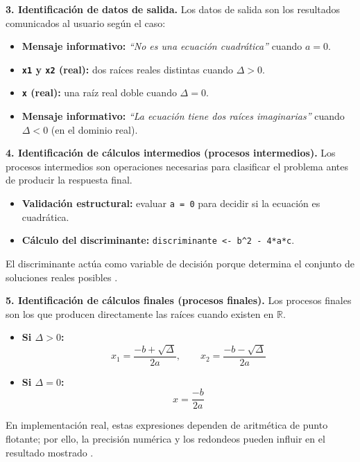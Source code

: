 \documentclass[12pt,twoside]{book}
\begin{document}
						\noindent
						\textbf{3. Identificación de datos de salida.}
						Los datos de salida son los resultados comunicados al usuario según el caso:
						
						\begin{itemize}
							\item \textbf{Mensaje informativo:} \textit{``No es una ecuación cuadrática''} cuando $a=0$.
							\item \textbf{\texttt{x1} y \texttt{x2} (real):} dos raíces reales distintas cuando $\Delta>0$.
							\item \textbf{\texttt{x} (real):} una raíz real doble cuando $\Delta=0$.
							\item \textbf{Mensaje informativo:} \textit{``La ecuación tiene dos raíces imaginarias''} cuando $\Delta<0$ (en el dominio real).
						\end{itemize}
						
						\noindent
						\textbf{4. Identificación de cálculos intermedios (procesos intermedios).}
						Los procesos intermedios son operaciones necesarias para clasificar el problema antes de producir la respuesta final.
						
						\begin{itemize}
							\item \textbf{Validación estructural:} evaluar \texttt{a = 0} para decidir si la ecuación es cuadrática.
							\item \textbf{Cálculo del discriminante:} \texttt{discriminante <- b\^{}2 - 4*a*c}.
						\end{itemize}
						
						\noindent
						El discriminante actúa como variable de decisión porque determina el conjunto de soluciones reales posibles \cite{Joyanes2007Fundamentos}.
						
						\noindent
						\textbf{5. Identificación de cálculos finales (procesos finales).}
						Los procesos finales son los que producen directamente las raíces cuando existen en $\mathbb{R}$.
						
						\begin{itemize}
							\item \textbf{Si $\Delta>0$:}
							\[
							x_1=\frac{-b+\sqrt{\Delta}}{2a},\qquad x_2=\frac{-b-\sqrt{\Delta}}{2a}
							\]
							\item \textbf{Si $\Delta=0$:}
							\[
							x=\frac{-b}{2a}
							\]
						\end{itemize}
						
						\noindent
						En implementación real, estas expresiones dependen de aritmética de punto flotante; por ello, la precisión numérica y los redondeos pueden influir en el resultado mostrado \cite{Goldberg1991What,IEEE2019Standard754}.
						
\end{document}
